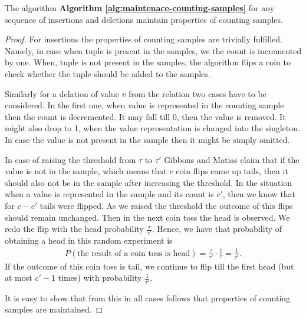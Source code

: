 \begin{theorem}
The algorithm \textbf{Algorithm \ref{alg:maintenace-counting-samples}}
for any sequence of insertions and deletions maintain properties of
counting samples.
\end{theorem}
\begin{proof}
  For insertions the properties of counting samples are trivially
  fulfilled. Namely, in case when tuple is present in the samples, we
  the count is incremented by one. When, tuple is not present in the
  samples, the algorithm flips a coin to check whether the tuple
  should be added to the samples.

  Similarly for a delation of value $v$ from the relation two cases
  have to be considered. In the first one, when value is represented
  in the counting sample then the count is decremented. It may fall
  till 0, then the value is removed. It might also drop to 1, when the
  value representation is changed into the singleton. In case the
  value is not present in the sample then it might be simply omitted.

  In case of raising the threshold from $\tau$ to $\tau'$ Gibbons and
  Matias claim that if the value is not in the sample, which means
  that $c$ coin flips came up tails, then it should also not be in the
  sample after increasing the threshold. In the situation when a value
  is represented in the sample and its count is $c'$, then we know
  that for $c - c'$ tails were flipped. As we raised the threshold
  the outcome of this flips should remain unchanged. Then in the next
  coin toss the head is observed. We redo the flip with the head
  probability $\frac{\tau}{\tau'}$. Hence, we have that probability of
  obtaining a head in this random experiment is
  \begin{align*}
    P \left(  \text{the result of a coin toss is head} \right) =
    \frac{\tau}{\tau'} \cdot \frac{1}{\tau} = \frac{1}{\tau'}.
  \end{align*}
  If the outcome of this coin toss is tail, we continue to flip
  till the first head (but at most $c' - 1$ times) with probability
  $\frac{1}{\tau'}$.

  It is easy to show that from this in all cases follows that
  properties of counting samples are maintained.
\end{proof}

